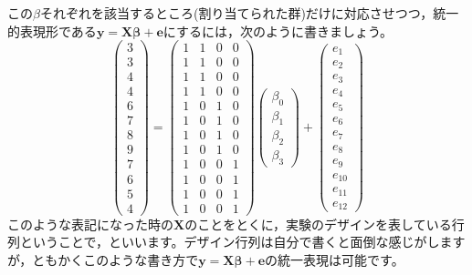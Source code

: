 \documentclass{ltjsbook}
\begin{document}
この$\beta$それぞれを該当するところ(割り当てられた群)だけに対応させつつ，統一的表現形である$\bm{y}=\bm{X\beta}+\bm{e}$にするには，次のように書きましょう。
\[
	\begin{pmatrix}
		3 \\
		3 \\
		4 \\
		4 \\
		6 \\
		7 \\
		8 \\
		9 \\
		7 \\
		6 \\
		5 \\
		4
	\end{pmatrix}
	=
	\begin{pmatrix}
		1 & 1 & 0 & 0 \\
		1 & 1 & 0 & 0 \\
		1 & 1 & 0 & 0 \\
		1 & 1 & 0 & 0 \\
		1 & 0 & 1 & 0 \\
		1 & 0 & 1 & 0 \\
		1 & 0 & 1 & 0 \\
		1 & 0 & 1 & 0 \\
		1 & 0 & 0 & 1 \\
		1 & 0 & 0 & 1 \\
		1 & 0 & 0 & 1 \\
		1 & 0 & 0 & 1
	\end{pmatrix}
	\begin{pmatrix}
		\beta_0 \\
		\beta_1 \\
		\beta_2 \\
		\beta_3
	\end{pmatrix}+
	\begin{pmatrix}
		e_1    \\
		e_2    \\
		e_3    \\
		e_4    \\
		e_5    \\
		e_6    \\
		e_7    \\
		e_8    \\
		e_9    \\
		e_{10} \\
		e_{11} \\
		e_{12}
	\end{pmatrix}
\]
このような表記になった時の$\bm{X}$のことをとくに，実験のデザインを表している行列ということで，といいます。デザイン行列は自分で書くと面倒な感じがしますが，ともかくこのような書き方で$\bm{y}=\bm{X\beta}+\bm{e}$の統一表現は可能です。
\end{document}

